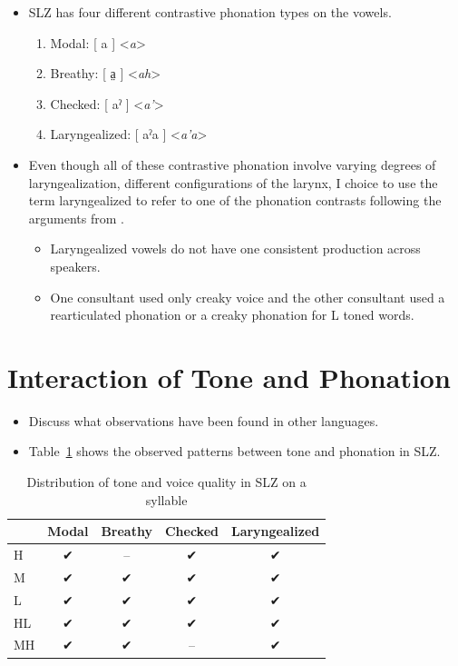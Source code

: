 \documentclass[12pt, letterpaper]{article}
\providecommand{\lsptoprule}{\midrule\toprule}
\providecommand{\lspbottomrule}{\bottomrule\midrule}
\begin{document}
\begin{itemize}
	\item SLZ has four different contrastive phonation types on the vowels. 
	\begin{enumerate}
		\item Modal: [ a ] <\textit{a}>
		\item Breathy: [ a̤ ] <\textit{ah}> 
		\item Checked: [ aˀ ] <\textit{a'}> 
		\item Laryngealized: [ aˀa ] <\textit{a'a}> 
	\end{enumerate}
	\item Even though all of these contrastive phonation involve varying degrees of laryngealization, different configurations of the larynx, I choice to use the term laryngealized to refer to one of the phonation contrasts following the arguments from \citet{avelinoAcousticElectroglottographicAnalyses2010}.
	\begin{itemize}
		\item Laryngealized vowels do not have one consistent production across speakers. 
		\item One consultant used only creaky voice and the other consultant used a rearticulated phonation or a creaky phonation for L toned words. 
	\end{itemize}
\end{itemize}

\section{Interaction of Tone and Phonation} \label{sec:Interaction}

\begin{itemize}
	\item Discuss what observations have been found in other languages. 
	\item Table~\ref{tab:ToneVoiceQuality} shows the observed patterns between tone and phonation in SLZ. 
\end{itemize}

\vspace{-20pt}
\begin{table}[!h]
	\caption{Distribution of tone and voice quality in SLZ on a syllable}
	\label{tab:ToneVoiceQuality}
	\centering

	\begin{tabular}{lcccc}
	\lsptoprule
		& \textbf{Modal} & \textbf{Breathy} & \textbf{Checked} & \textbf{Laryngealized} \\
	\hline
	H	& ✔ & -- & ✔ & ✔ \\
	M	& ✔ & ✔ & ✔ & ✔\\
	L	& ✔	& ✔ & ✔ & ✔\\
	HL	& ✔	& ✔ & ✔ & ✔\\
	MH	& ✔	& ✔ & -- & ✔ \\
	\lspbottomrule
	\end{tabular}
\end{table}
\end{document}
